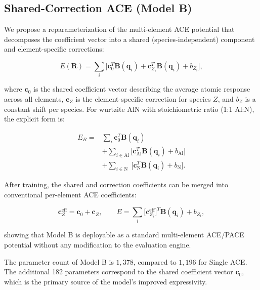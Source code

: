\documentclass[twoside,prb,aps,floatfix,superscriptaddress,longbibliography]{revtex4-2}
\begin{document}
\subsection{Shared-Correction ACE (Model B)}
\label{sec:model_b}

We propose a reparameterization of the multi-element ACE potential that decomposes the coefficient vector into a shared (species-independent) component and element-specific corrections:

\begin{equation}
E(\mathbf{R}) = \sum_i \Big[ \mathbf{c}_0^T \mathbf{B}(\mathbf{q}_i) + \mathbf{c}_{Z_i}^T \mathbf{B}(\mathbf{q}_i) + b_{Z_i} \Big],
\label{eq:model_b}
\end{equation}

where $\mathbf{c}_0$ is the shared coefficient vector describing the average atomic response across all elements, $\mathbf{c}_Z$ is the element-specific correction for species $Z$, and $b_Z$ is a constant shift per species. For wurtzite AlN with stoichiometric ratio (1:1 Al:N), the explicit form is:

\begin{equation}
\begin{aligned}
E_B = &\sum_i \mathbf{c}_0^T \mathbf{B}(\mathbf{q}_i) \\
      &+ \sum_{i \in \mathrm{Al}} \big[ \mathbf{c}_{\mathrm{Al}}^T \mathbf{B}(\mathbf{q}_i) + b_{\mathrm{Al}} \big] \\
      &+ \sum_{i \in \mathrm{N}} \; \big[ \mathbf{c}_{\mathrm{N}}^T \mathbf{B}(\mathbf{q}_i) + b_{\mathrm{N}} \big].
\end{aligned}
\label{eq:model_b_explicit}
\end{equation}

After training, the shared and correction coefficients can be merged into conventional per-element ACE coefficients:

\begin{equation}
\mathbf{c}_Z^{\mathrm{eff}} = \mathbf{c}_0 + \mathbf{c}_Z,
\qquad
E = \sum_i \big[ \mathbf{c}_{Z_i}^{\mathrm{eff}} \big]^T \mathbf{B}(\mathbf{q}_i) + b_{Z_i},
\label{eq:merge}
\end{equation}

showing that Model B is deployable as a standard multi-element ACE/PACE potential without any modification to the evaluation engine.

The parameter count of Model B is $1{,}378$, compared to $1{,}196$ for Single ACE. The additional 182 parameters correspond to the shared coefficient vector $\mathbf{c}_0$, which is the primary source of the model's improved expressivity.
\end{document}

